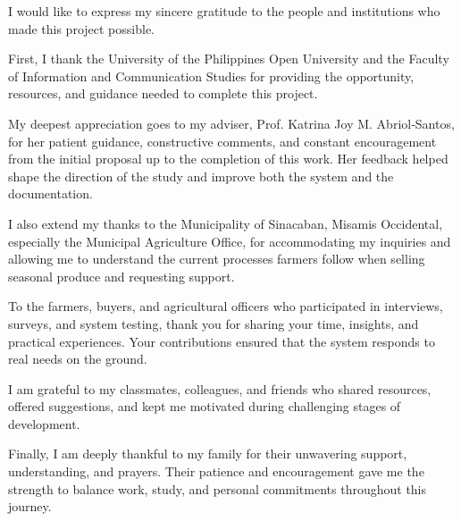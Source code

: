 





\begin{acknowledgement}
     I would like to express my sincere gratitude to the people and institutions who made this project possible.

First, I thank the University of the Philippines Open University and the Faculty of Information and Communication Studies for providing the opportunity, resources, and guidance needed to complete this project.

My deepest appreciation goes to my adviser, Prof. Katrina Joy M. Abriol‑Santos, for her patient guidance, constructive comments, and constant encouragement from the initial proposal up to the completion of this work. Her feedback helped shape the direction of the study and improve both the system and the documentation.

I also extend my thanks to the Municipality of Sinacaban, Misamis Occidental, especially the Municipal Agriculture Office, for accommodating my inquiries and allowing me to understand the current processes farmers follow when selling seasonal produce and requesting support.

To the farmers, buyers, and agricultural officers who participated in interviews, surveys, and system testing, thank you for sharing your time, insights, and practical experiences. Your contributions ensured that the system responds to real needs on the ground.

I am grateful to my classmates, colleagues, and friends who shared resources, offered suggestions, and kept me motivated during challenging stages of development.

Finally, I am deeply thankful to my family for their unwavering support, understanding, and prayers. Their patience and encouragement gave me the strength to balance work, study, and personal commitments throughout this journey.
\end{acknowledgement}
